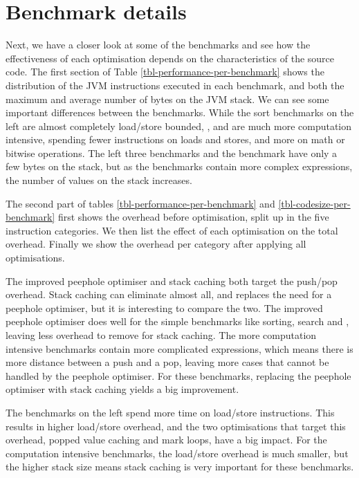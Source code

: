 \section{Benchmark details}
Next, we have a closer look at some of the benchmarks and see how the effectiveness of each optimisation depends on the characteristics of the source code. The first section of Table \ref{tbl-performance-per-benchmark} shows the distribution of the JVM instructions executed in each benchmark, and both the maximum and average number of bytes on the JVM stack. We can see some important differences between the benchmarks. While the sort benchmarks on the left are almost completely load/store bounded, ,  and  are much more computation intensive, spending fewer instructions on loads and stores, and more on math or bitwise operations. The left three benchmarks and the  benchmark have only a few bytes on the stack, but as the benchmarks contain more complex expressions, the number of values on the stack increases.

The second part of tables \ref{tbl-performance-per-benchmark} and \ref{tbl-codesize-per-benchmark} first shows the overhead before optimisation, split up in the five instruction categories. We then list the effect of each optimisation on the total overhead. Finally we show the overhead per category after applying all optimisations.

The improved peephole optimiser and stack caching both target the push/pop overhead. Stack caching can eliminate almost all, and replaces the need for a peephole optimiser, but it is interesting to compare the two. The improved peephole optimiser does well for the simple benchmarks like sorting,  search and , leaving less overhead to remove for stack caching. The more computation intensive benchmarks contain more complicated expressions, which means there is more distance between a push and a pop, leaving more cases that cannot be handled by the peephole optimiser. For these benchmarks, replacing the peephole optimiser with stack caching yields a big improvement.

The benchmarks on the left spend more time on load/store instructions. This results in higher load/store overhead, and the two optimisations that target this overhead, popped value caching and mark loops, have a big impact. For the computation intensive benchmarks, the load/store overhead is much smaller, but the higher stack size means stack caching is very important for these benchmarks.

